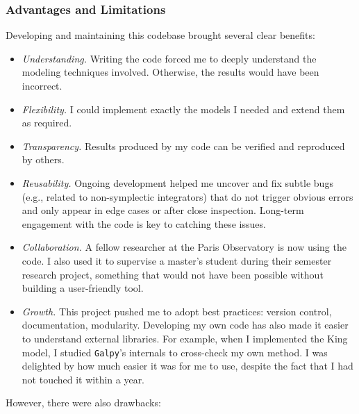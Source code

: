         \subsubsection{Advantages and Limitations}
        Developing and maintaining this codebase brought several clear benefits:
        \begin{itemize}
            \item \textit{Understanding.} Writing the code forced me to deeply understand the modeling techniques involved. Otherwise, the results would have been incorrect.
            \item \textit{Flexibility.} I could implement exactly the models I needed and extend them as required.
            \item \textit{Transparency.} Results produced by my code can be verified and reproduced by others.
            \item \textit{Reusability.} Ongoing development helped me uncover and fix subtle bugs (e.g., related to non-symplectic integrators) that do not trigger obvious errors and only appear in edge cases or after close inspection. Long-term engagement with the code is key to catching these issues.
            \item \textit{Collaboration.} A fellow researcher at the Paris Observatory is now using the code. I also used it to supervise a master's student during their semester research project, something that would not have been possible without building a user-friendly tool.
            \item \textit{Growth.} This project pushed me to adopt best practices: version control, documentation, modularity. Developing my own code has also made it easier to understand external libraries. For example, when I implemented the King model, I studied \texttt{Galpy}'s internals to cross-check my own method. I was delighted by how much easier it was for me to use, despite the fact that I had not touched it within a year.
        \end{itemize}
        However, there were also drawbacks:
